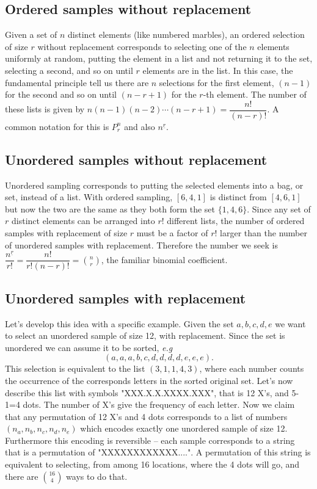 \documentclass[../main.tex]{subfiles}
\begin{document}
\subsection{Ordered samples without replacement}
Given a set of $n$ distinct elements (like numbered marbles), an
ordered selection of size $r$ without replacement corresponds to selecting
one of the $n$ elements uniformly at random, putting the element in a 
list and not returning it to the set, selecting a second, and so on until $r$ elements
are in the list. In this case, the fundamental principle tell us there are $n$ selections
for the first element, $(n-1)$ for the second and so on until $(n-r+1)$ for the $r$-th
element. The number of these lists is given by $n(n-1)(n-2)\cdots(n-r+1) = \dfrac{n!}{(n-r)!}$.
A common notation for this is $P^n_r$ and also $n^{\underline{r}}$.
\subsection{Unordered samples without replacement}
Unordered sampling corresponds to putting the selected elements into a
bag, or set, instead of a list. With ordered sampling, $[6,4,1]$ is distinct from $[4,6,1]$ but now
the two are the same as they both form the set $\{1,4,6\}.$ Since any set of $r$ distinct
elements can be arranged into $r!$ different lists, the number of ordered samples with replacement of size $r$ must be a factor of $r!$ larger than the number of unordered samples
with replacement. Therefore the number we seek is $
\dfrac{n^{\underline{r}}}{r!} = \dfrac{n!}{r!(n-r)!}
 = \displaystyle {n \choose r}$, the familiar binomial coefficient.
\subsection{Unordered samples with replacement}
Let's develop this idea with a specific example. Given the set ${a,b,c,d,e}$ we want
to select an unordered sample of size 12, with replacement. Since the
set is unordered we can assume it to be sorted, \textit{e.g} 
	$$(a,a,a,b,c,d,d,d,d,e,e,e).$$
This selection is equivalent to the list $(3,1,1,4,3)$, where each number counts the occurrence
of the corresponds letters in the sorted original set. Let's now describe this list
with symbols "XXX.X.X.XXXX.XXX", that is 12 X's, and 5-1=4 dots. The number of X's 
give the frequency of each letter. Now we claim that any permutation
of 12 X's and 4 dots corresponds to a list of numbers $(n_a,n_b,n_c,n_d,n_e)$
which encodes exactly one unordered sample of size 12. Furthermore this encoding is reversible
-- each sample corresponds to a string that is a permutation of "XXXXXXXXXXXX....". 
A permutation of this string is equivalent to selecting, from among 16 locations,
where the 4 dots will go, and there are $\displaystyle {16 \choose 4}$ ways to do that.
\end{document}
